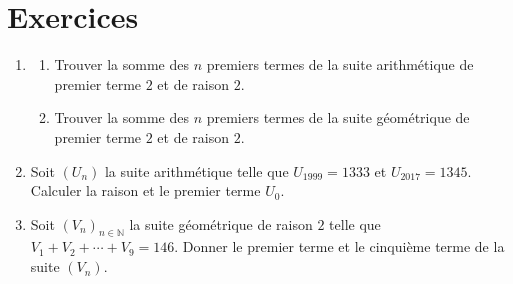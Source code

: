\TCDLessonStyleOff
\clearpage
\section{Exercices} 
\begin{exo}\label{exo:suite-1}
\begin{enumerate}
      \item \begin{enumerate}
                  \item Trouver la somme des $n$ premiers termes de la 
                        suite arithm\'etique de premier terme $2$ et de raison $2$.
                  \item Trouver la somme des $n$ premiers termes de la 
                        suite g\'eom\'etrique de premier terme $2$ et de raison $2$.
            \end{enumerate}
      \item Soit $(U_n)$ la suite arithm\'etique telle que $U_{1999} = 1333$ et $U_{2017} = 1345$.
            Calculer la raison et le premier terme $U_0$.
      \item Soit $(V_n)_{n \in \mathbb{N}}$ la suite g\'eom\'etrique de raison $2$ telle que $V_1 + V_2 + \cdots + V_9 = 146$.
            Donner le premier terme et le cinqui\`eme terme de la suite $(V_n)$.
\end{enumerate}
\end{exo}
%
